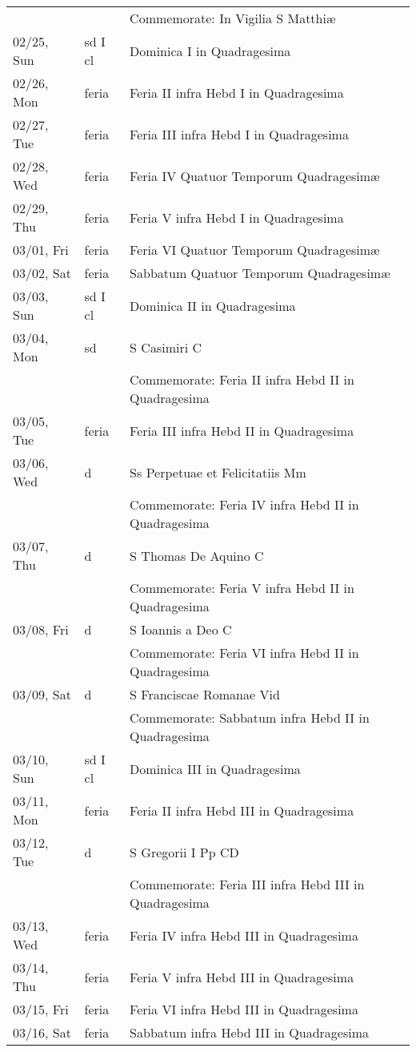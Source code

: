 \documentclass{article}
\begin{document}
\begin{longtable}{ l l l }
 & & Commemorate: In Vigilia S Matthiæ\\
02/25, Sun & sd I cl & Dominica I in Quadragesima\\
02/26, Mon & feria & Feria II infra Hebd I in Quadragesima\\
02/27, Tue & feria & Feria III infra Hebd I in Quadragesima\\
02/28, Wed & feria & Feria IV Quatuor Temporum Quadragesimæ\\
02/29, Thu & feria & Feria V infra Hebd I in Quadragesima\\
03/01, Fri & feria & Feria VI Quatuor Temporum Quadragesimæ\\
03/02, Sat & feria & Sabbatum Quatuor Temporum Quadragesimæ\\
03/03, Sun & sd I cl & Dominica II in Quadragesima\\
03/04, Mon & sd & S Casimiri C\\
 & & Commemorate: Feria II infra Hebd II in Quadragesima\\
03/05, Tue & feria & Feria III infra Hebd II in Quadragesima\\
03/06, Wed & d & Ss Perpetuae et Felicitatiis Mm\\
 & & Commemorate: Feria IV infra Hebd II in Quadragesima\\
03/07, Thu & d & S Thomas De Aquino C\\
 & & Commemorate: Feria V infra Hebd II in Quadragesima\\
03/08, Fri & d & S Ioannis a Deo C\\
 & & Commemorate: Feria VI infra Hebd II in Quadragesima\\
03/09, Sat & d & S Franciscae Romanae Vid\\
 & & Commemorate: Sabbatum infra Hebd II in Quadragesima\\
03/10, Sun & sd I cl & Dominica III in Quadragesima\\
03/11, Mon & feria & Feria II infra Hebd III in Quadragesima\\
03/12, Tue & d & S Gregorii I Pp CD\\
 & & Commemorate: Feria III infra Hebd III in Quadragesima\\
03/13, Wed & feria & Feria IV infra Hebd III in Quadragesima\\
03/14, Thu & feria & Feria V infra Hebd III in Quadragesima\\
03/15, Fri & feria & Feria VI infra Hebd III in Quadragesima\\
03/16, Sat & feria & Sabbatum infra Hebd III in Quadragesima\\

\end{longtable}
\end{document}
